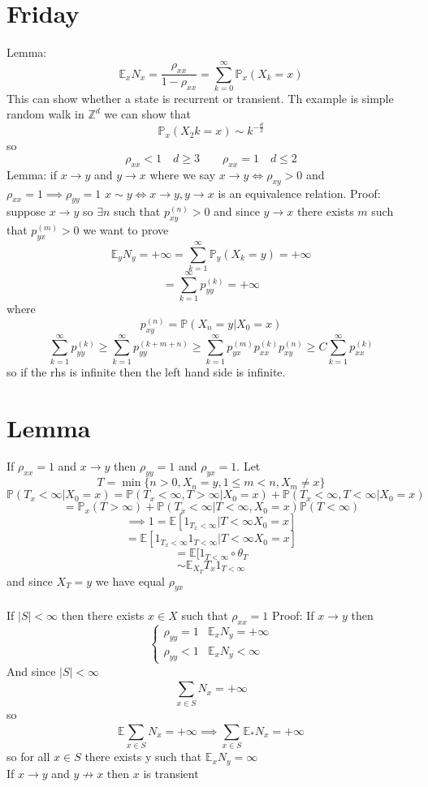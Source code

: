 \documentclass[11pt]{article}
\begin{document}
\section{Friday}

Lemma: 
\[
    \mathbb{E}_x N_x = \frac{\rho_{xx}}{1 - \rho_{xx}} = \sum_{k=0}^{\infty} \mathbb{P}_x(X_k = x)
\] 
This can show whether a state is recurrent or transient.
Th example is simple random walk in $ \mathbb{Z}^{d}$ we can show that
\[
\mathbb{P}_x(X_2k = x) \sim k^{-\frac{d}{2}}
\] 
so
\[
    \rho_{xx} < 1 \quad d \ge 3 \qquad \rho_{xx} = 1 \quad d \le 2
\] 
Lemma:
if $x \to y$  and  $y \to x$ where we say  $x \to y \iff \rho_{xy} > 0$
and $\rho_{xx} = 1 \implies \rho_{yy} = 1$
$x \sim y \iff x \to y, y \to x$ is an equivalence relation.
Proof:
suppose  $x \to y$ so  $\exists n$ such that  $p^{(n)}_{xy} > 0$ 
and since $y \to x$ there exists  $m$ such that  $p_{yx}^{(m)} > 0$ we want to prove
\[
\mathbb{E}_y N_y = +\infty = \sum_{k=1}^{\infty} \mathbb{P}_y(X_k = y) = +\infty
\] 
\[
    = \sum_{k=1}^{\infty} p_{yy}^{(k)} = +\infty
\] 
where
\[
    p_{xy}^{(n)} = \mathbb{P}(X_n = y| X_0 = x)
\] 
\[
    \sum_{k=1}^{\infty} p_{yy}^{(k)} \ge \sum_{k=1}^{\infty}p^{(k+m+n)}_{yy} \ge \sum_{k=1}^{\infty}p_{yx}^{(m)}p^{(k)}_{xx}p^{(n)}_{xy} \ge C \sum_{k=1}^{\infty}p_{xx}^{(k)} 
\] 
so if the rhs is infinite then the left hand side is infinite.
\section{Lemma}
If $\rho_{xx} = 1$ and $x \to y$ then  $\rho_{yy} = 1$ and $\rho_{yx} = 1$.
Let
\[
    T = \min\{n > 0, X_n = y , 1 \le m < n, X_m \ne x\}
\] 
\[
\mathbb{P}(T_x < \infty | X_0 = x) = \mathbb{P}(T_x < \infty , T> \infty | X_0 = x) + \mathbb{P}(T_x < \infty, T < \infty | X_0 = x)
\] 
\[
 = \mathbb{P}_x(T > \infty) + \mathbb{P}(T_x < \infty | T< \infty , X_0 = x)  \mathbb{P}(T < \infty)
\] 
\[
   \implies 1 =  \mathbb{E}[1_{T_x < \infty} | T< \infty X_0 =x]
\] 
\[
    = \mathbb{E}[1_{T_x < \infty} 1_{T < \infty} | T< \infty X_0 = x]
\] 
\[
    = \mathbb{E}[1_{T < \infty} \circ \theta_T
\] 
\[
    \sim  \mathbb{E}_{X_T} T_x 1_{T< \infty}
\] 
and since $X_T = y$ we have equal  $\rho_{yx}$\\
\\
If $|S| < \infty$ then there exists $x \in X$ such that  $\rho_{xx} = 1$
Proof: If $x \to y$  then
\[
\begin{cases}
    \rho_{yy} = 1 & \mathbb{E}_x N_y = +\infty\\
    \rho_{yy} < 1 & \mathbb{E}_x N_y < \infty
\end{cases}
\] 
And since $|S| < \infty$
\[
\sum_{x \in S}^{} N_x = +\infty
\] 
so
\[
    \mathbb{E} \sum_{x \in S}^{} N_x = +\infty \implies \sum_{x \in S}^{} \mathbb{E}_{*}N_x = +\infty 
\] 
so for all $x \in S$ there exists y such that  $ \mathbb{E}_x N_y = \infty$\\
If $x \to y$ and  $y \not\to x$ then  $x $ is transient
\end{document}
